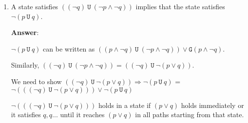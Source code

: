 \documentclass[11pt]{article}
\newcommand{\af}[1]{\texttt{AF}(#1)}
\newcommand{\ef}[1]{\texttt{EF}(#1)}
\newcommand{\ag}[1]{\texttt{AG}(#1)}
\newcommand{\lf}[1]{\texttt{F}(#1)}
\newcommand{\llg}[1]{\texttt{G}(#1)}
\newcommand{\lu}[2]{(#1\ \texttt{U}\ #2)}
\begin{document}
\begin{enumerate}
\begin{enumerate}
\begin{center}
        \end{center}




       


       
  \item A state satisfies $\lu{(\neg q)}{(\neg p \land \neg q)} $ implies
    that the state satisfies $\neg \lu{p}{q}$.
    
\textbf{Answer}:

$\neg \lu{p}{q}$ can be written as $\lu{(p \land \neg q)}{(\neg p \land \neg q)} \lor \llg{p \land \neg q}$.


 Similarly, $\lu{(\neg q)}{(\neg p \land \neg q)} = \lu{(\neg q)}{\neg (p \lor q)}$. 

 We need to show $\lu{(\neg q)}{\neg (p \lor q)}  \Rightarrow \neg \lu{p}{q}$ = $\neg (\lu{(\neg q)}{\neg (p \lor q)})  \lor \neg \lu{p}{q}$ 
 
 $\neg (\lu{(\neg q)}{\neg (p \lor q)})$ holds in a state if $(p \lor q)$ holds immediately or it satisfies $q, q ...$ until it reaches  $(p \lor q)$ in all paths starting from that state.  


\end{enumerate}
\end{enumerate}
\end{document}
